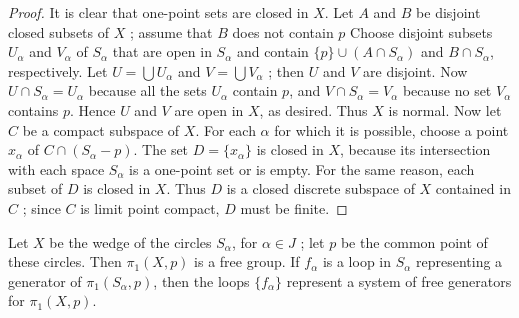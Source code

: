 \begin{proof}
It is clear that one-point sets are closed in \(X\). Let \(A\) and \(B\) be disjoint closed subsets of \(X\) ; assume that \(B\) does not contain \(p\) Choose disjoint subsets \(U_{\alpha }\) and \(V_{\alpha }\) of \(S_{\alpha }\) that are open in \(S_{\alpha }\) and contain \(\{ p\} \cup ( {A \cap {S}_{\alpha }})\) and \(B \cap {S}_{\alpha }\), respectively. Let \(U = \bigcup {U}_{\alpha }\) and \(V = \bigcup {V}_{\alpha }\) ; then \(U\) and \(V\) are disjoint. Now \(U \cap {S}_{\alpha } = U_{\alpha }\) because all the sets \(U_{\alpha }\) contain \(p\), and \(V \cap {S}_{\alpha } = V_{\alpha }\) because no set \(V_{\alpha }\) contains \(p\). Hence \(U\) and \(V\) are open in \(X\), as desired. Thus \(X\) is normal.
Now let \(C\) be a compact subspace of \(X\). For each \(\alpha\) for which it is possible, choose a point \(x_{\alpha }\) of \(C \cap ( {S_{\alpha } - p})\). The set \(D = \{ x_{\alpha }\}\) is closed in \(X\), because its intersection with each space \(S_{\alpha }\) is a one-point set or is empty. For the same reason, each subset of \(D\) is closed in \(X\). Thus \(D\) is a closed discrete subspace of \(X\) contained in \(C\) ; since \(C\) is limit point compact, \(D\) must be finite.
\end{proof}
\begin{theorem}
\label{thm:\thetheorem}
Let \(X\) be the wedge of the circles \(S_{\alpha }\), for \(\alpha \in J\) ; let \(p\) be the common point of these circles. Then \({\pi }_{1}( {X,p})\) is a free group. If \(f_{\alpha }\) is a loop in \(S_{\alpha }\) representing a generator of \({\pi }_{1}( {S_{\alpha },p})\), then the loops \(\{ f_{\alpha }\}\) represent a system of free generators for \({\pi }_{1}( {X,p})\).
\end{theorem}

